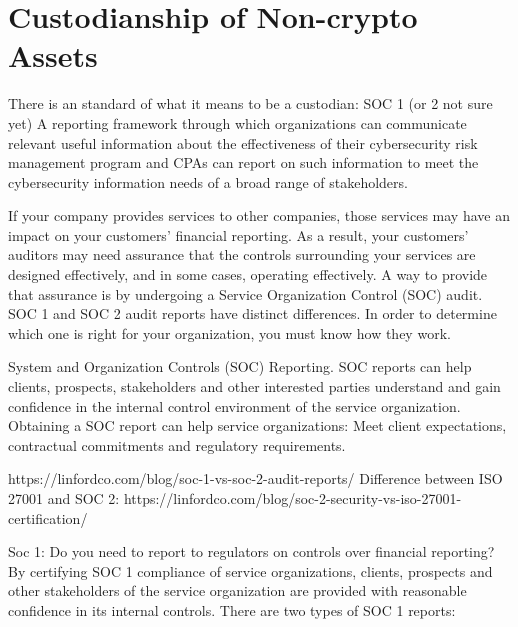 %






\section{Custodianship of Non-crypto Assets}
There is an standard of what it means to be a custodian: SOC 1 (or 2 not sure yet)
A reporting framework through which organizations can communicate relevant useful information about the effectiveness of their cybersecurity risk management program and CPAs can report on such information to meet the cybersecurity information needs of a broad range of stakeholders. \par
If your company provides services to other companies, those services may have an impact on your customers’ financial reporting. As a result, your customers’ auditors may need assurance that the controls surrounding your services are designed effectively, and in some cases, operating effectively. A way to provide that assurance is by undergoing a Service Organization Control (SOC) audit. SOC 1 and SOC 2 audit reports have distinct differences. In order to determine which one is right for your organization, you must know how they work.
\par
System and Organization Controls (SOC) Reporting. SOC reports can help clients, prospects, stakeholders and other interested parties understand and gain confidence in the internal control environment of the service organization. Obtaining a SOC report can help service organizations: Meet client expectations, contractual commitments and regulatory requirements. 
 
 https://linfordco.com/blog/soc-1-vs-soc-2-audit-reports/
Difference between ISO 27001 and SOC 2: https://linfordco.com/blog/soc-2-security-vs-iso-27001-certification/
\par
Soc 1: Do you need to report to regulators on controls over financial reporting? By certifying SOC 1 compliance of service organizations, clients, prospects and other stakeholders of the service organization are provided with reasonable confidence in its internal controls. 
There are two types of SOC 1 reports:


